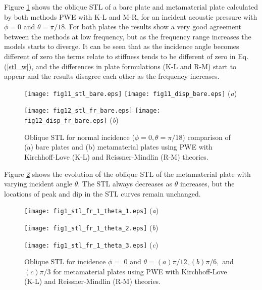 \documentclass[a4paper]{ICEDyn}
\begin{document}
Figure \ref{disp3} shows the oblique STL of a bare plate and metamaterial plate calculated by both methods PWE with K-L and M-R, for an incident acoustic pressure with $\phi = $0 and $ \theta = \pi/18 $. For both plates the results show a very good agreement between the methods at low frequency, but as the frequency range increases the models starts to diverge. It can be seen that as the incidence angle becomes different of zero the terms relate to stiffness tends to be different of zero in Eq.(\ref{stl_w}), and the differences in plate formulations (K-L and R-M) start to appear and the results disagree each other as the frequency increases.
\begin{figure}
	\begin{minipage} {.50\linewidth}
		\centering 
		\texttt{[image: fig11\_stl\_bare.eps]}
		\texttt{[image: fig11\_disp\_bare.eps]}
		{(\textit{a})}%
	\end{minipage}\hfill
	\begin{minipage}{.50\linewidth}
		\centering
		\texttt{[image: fig12\_stl\_fr\_bare.eps]}
		\texttt{[image: fig12\_disp\_fr\_bare.eps]}
		{(\textit{b})} %
	\end{minipage}\hfill
	\caption{Oblique STL for normal incidence ($\phi = 0, \theta = \pi/18$) comparison of (a) bare plates and (b) metamaterial plates using PWE with Kirchhoff-Love (K-L) and Reissner-Mindlin (R-M) theories.}
	\label{disp3}
\end{figure}

Figure \ref{disp4} shows the evolution of the oblique STL of the metamaterial plate with varying incident angle $ \theta $. The STL	always decreases as $ \theta $ increases, but the locations of peak and dip in the STL curves remain unchanged.
%
\begin{figure}
		\begin{minipage} {.50\linewidth}
		\centering 
		\texttt{[image: fig1\_stl\_fr\_1\_theta\_1.eps]}
		{(\textit{a})}	
		\end{minipage}\hfill
		\begin{minipage}{.50\linewidth}
		\centering
		\texttt{[image: fig1\_stl\_fr\_1\_theta\_2.eps]}
		{(\textit{b})}
		\end{minipage}\hfill
		\begin{minipage}{.50\linewidth}
		\centering
		\texttt{[image: fig1\_stl\_fr\_1\_theta\_3.eps]}
		{(\textit{c})}
		\end{minipage}\hfill
	\caption{Oblique STL for incidence $\phi =$ 0 and $\theta = (a)\pi/12, (b)\pi/6, $ and $(c)\pi/3 $ for metamaterial plates using PWE with Kirchhoff-Love (K-L) and Reissner-Mindlin (R-M) theories.}\label{disp4}
\end{figure}
\newpage
\end{document}
